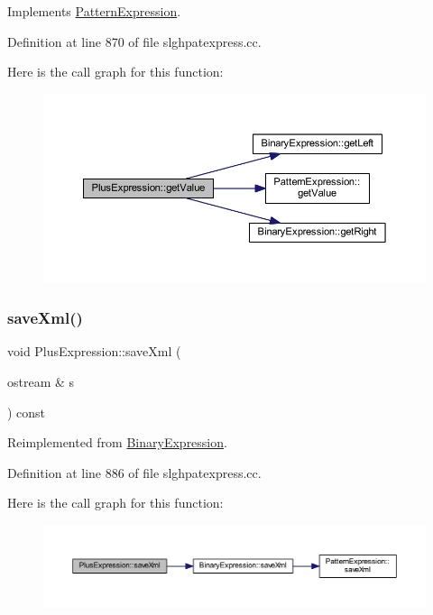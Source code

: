 Implements \mbox{\hyperlink{class_pattern_expression_a8332c6ea4c5a7e9dfc690df2a6458bb8}{Pattern\+Expression}}.



Definition at line 870 of file slghpatexpress.\+cc.

Here is the call graph for this function\+:
\nopagebreak
\begin{figure}[H]
\begin{center}
\leavevmode
\includegraphics[width=350pt]{class_plus_expression_af0089a678032ff29d411865ede9fd94e_cgraph}
\end{center}
\end{figure}
\mbox{\label{class_plus_expression_ab5da68f4bb5bed8e1eb0244f86bf8c23}} 
\subsubsection{\texorpdfstring{saveXml()}{saveXml()}}
{\footnotesize\ttfamily void Plus\+Expression\+::save\+Xml (\begin{DoxyParamCaption}\item[{ostream \&}]{s }\end{DoxyParamCaption}) const\hspace{0.3cm}{\ttfamily [virtual]}}



Reimplemented from \mbox{\hyperlink{class_binary_expression_a4b9e768a619b713d6c1ff35a618d98ec}{Binary\+Expression}}.



Definition at line 886 of file slghpatexpress.\+cc.

Here is the call graph for this function\+:
\nopagebreak
\begin{figure}[H]
\begin{center}
\leavevmode
\includegraphics[width=350pt]{class_plus_expression_ab5da68f4bb5bed8e1eb0244f86bf8c23_cgraph}
\end{center}
\end{figure}


